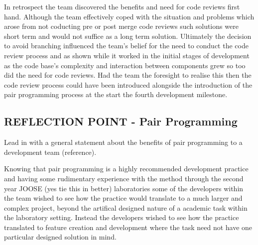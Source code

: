 \documentclass{l3proj}
\begin{document}
In retrospect the team discovered the benefits and need for code reviews first hand. Although the team effectively coped with the situation and problems which arose from not coducting pre or post merge code reviews such solutions were short term and would not suffice as a long term solution. Ultimately the decision to avoid branching influenced the team's belief for the need to conduct the code review process and as shown while it worked in the initial stages of development as the code base's complexity and interaction between components grew so too did the need for code reviews. Had the team the foresight to realise this then the code review process could have been introduced alongside the introduction of the pair programming process at the start the fourth development milestone.   


\subsection{REFLECTION POINT - Pair Programming}
\label{sec:pairprogramming}


Lead in with a general statement about the benefits of pair programming to a development team (reference). 

Knowing that pair programming is a highly recommended development practice and having some rudimentary experience with the method through the second year JOOSE (yes tie this in better) laboratories some of the developers within the team wished to see how the practice would translate to a much larger and complex project, beyond the artifical designed nature of a academic task within the laboratory setting. Instead the developers wished to see how the practice translated to feature creation and development where the task need not have one particular designed solution in mind.
\end{document}
